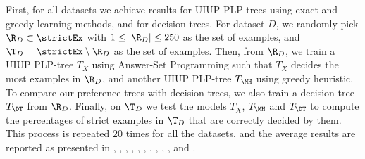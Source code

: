 First, for all datasets we achieve results for UIUP PLP-trees
using exact and greedy learning methods, and for decision trees.
For dataset $D$, we randomly pick $\R_D \subset \strictEx$ with $1 \leq |\R_D| \leq 250$
as the set of  examples,
and $\T_D = \strictEx \setminus \R_D$ as the set of  examples.
Then, from $\R_D$, we train a UIUP PLP-tree $T_X$ using Answer-Set Programming 
such that $T_X$ decides the most examples in $\R_D$, and another UIUP PLP-tree $T_\MH$ using
greedy heuristic.
To compare our preference trees with decision trees, we also train a decision tree $T_\DT$
from $\R_D$.
Finally, on $\T_D$ we test the models $T_X$, $T_\MH$ and $T_\DT$ to compute the percentages of 
strict examples in $\T_D$ that are correctly decided by them.
This process is repeated $20$ times for all the datasets, and the average results are reported
as  presented in , , , 
, ,
, , , , , and .

